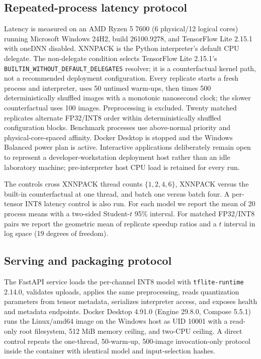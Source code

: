 \subsection{Repeated-process latency protocol}

Latency is measured on an AMD Ryzen 5 7600 (6 physical/12 logical cores) running Microsoft Windows 24H2, build 26100.9278, and TensorFlow Lite 2.15.1 with oneDNN disabled. XNNPACK is the Python interpreter's default CPU delegate. The non-delegate condition selects TensorFlow Lite 2.15.1's \texttt{BUILTIN\_WITHOUT\_DEFAULT\_DELEGATES} resolver; it is a counterfactual kernel path, not a recommended deployment configuration. Every replicate starts a fresh process and interpreter, uses 50 untimed warm-ups, then times 500 deterministically shuffled images with a monotonic nanosecond clock; the slower counterfactual uses 100 images. Preprocessing is excluded. Twenty matched replicates alternate FP32/INT8 order within deterministically shuffled configuration blocks. Benchmark processes use above-normal priority and physical-core-spaced affinity. Docker Desktop is stopped and the Windows Balanced power plan is active. Interactive applications deliberately remain open to represent a developer-workstation deployment host rather than an idle laboratory machine; pre-interpreter host CPU load is retained for every run.

The controls cross XNNPACK thread counts $\{1,2,4,6\}$, XNNPACK versus the built-in counterfactual at one thread, and batch one versus batch four. A per-tensor INT8 latency control is also run. For each model we report the mean of 20 process means with a two-sided Student-$t$ 95\% interval. For matched FP32/INT8 pairs we report the geometric mean of replicate speedup ratios and a $t$ interval in log space (19 degrees of freedom).

\subsection{Serving and packaging protocol}

The FastAPI service loads the per-channel INT8 model with \texttt{tflite-runtime} 2.14.0, validates uploads, applies the same preprocessing, reads quantization parameters from tensor metadata, serializes interpreter access, and exposes health and metadata endpoints. Docker Desktop 4.91.0 (Engine 29.8.0, Compose 5.5.1) runs the Linux/amd64 image on the Windows host as UID 10001 with a read-only root filesystem, 512 MiB memory ceiling, and two-CPU ceiling. A direct control repeats the one-thread, 50-warm-up, 500-image invocation-only protocol inside the container with identical model and input-selection hashes.

